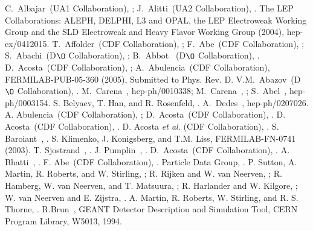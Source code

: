 \documentclass[aps,prd,onecolumn,superscriptaddress,showpacs]{revtex4}
\begin{document}
\begin{thebibliography}{99}

%
%
 C.~Albajar~\etal  (UA1 Collaboration),  ;
J.~Alitti~\etal  (UA2 Collaboration),  .
 The LEP Collaborations: ALEPH, DELPHI, L3 and OPAL, the LEP Electroweak Working Group and the SLD Electroweak
and Heavy Flavor Working Group (2004), hep-ex/0412015.
 T.~Affolder~\etal (CDF Collaboration), ; 
F.~Abe~\etal  (CDF Collaboration), ; 
S.~Abachi~\etal  (D$\O$ Collaboration), ; 
B.~Abbot~\etal {} (D$\O$ Collaboration), . 
 D.~Acosta~\etal  (CDF Collaboration), ;
A.~Abulencia~\etal (CDF Collaboration), FERMILAB-PUB-05-360 (2005), Submitted to Phys. Rev. D. 
 V.M.~Abazov~\etal (D$\O$ Collaboration), .
 M.~Carena~\etal, hep-ph/0010338; M.~Carena~\etal, ; S.~Abel~\etal, hep-ph/0003154.
 S. Belyaev, T. Han, and R. Rosenfeld, .
 A.~Dedes~\etal, hep-ph/0207026.
 A. Abulencia~\etal (CDF Collaboration), ; 
D.~Acosta~\etal (CDF Collaboration),  .
 D. Acosta~\etal (CDF Collaboration), . 
  D. Acosta {\em et al.} (CDF Collaboration), .
 S. Baroiant~\etal, .
 S. Klimenko, J. Konigsberg, and T.M. Liss, FERMILAB-FN-0741 (2003). 
 T. Sjostrand~\etal, .
 J. Pumplin~\etal, .
 D.~Acosta~\etal (CDF Collaboration), .
 A. Bhatti~\etal, .
 F. Abe~\etal (CDF Collaboration), .
 Particle Data Group, .
 P. Sutton, A. Martin, R. Roberts, and W. Stirling, ;
R. Rijken and W. van Neerven, ;
R. Hamberg, W. van Neerven, and T. Matsuura, ;
R. Harlander and W. Kilgore, ;
W. van Neerven and E. Zijstra, .
 A. Martin, R. Roberts, W. Stirling, and R. S. Thorne, .
 R.Brun~\etal, GEANT Detector Description and Simulation Tool, CERN Program Library, W5013, 1994.


\end{thebibliography}
\end{document}
